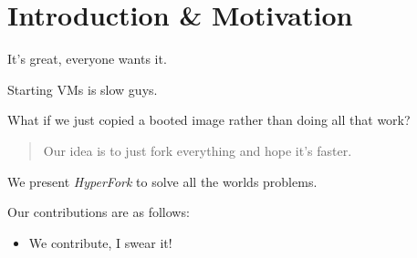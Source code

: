 \section{Introduction \& Motivation} \label{sec:intro}
It's great, everyone wants it.

Starting VMs is slow guys.

What if we just copied a booted image rather than doing all that work?


\begin{quote}
Our idea is to just fork everything and hope it's faster.
\end{quote}

We present \emph{HyperFork} to solve all the worlds problems.

Our contributions are as follows:
\begin{itemize}
\item We contribute, I swear it!

\end{itemize}
